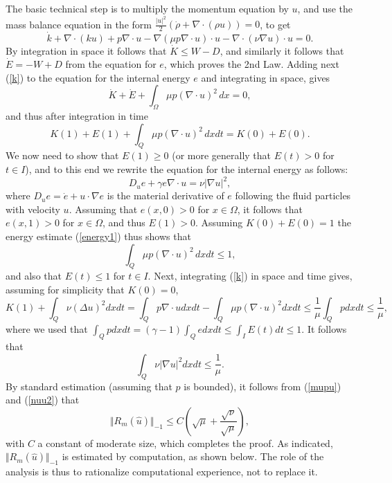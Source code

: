 The basic technical step is to multiply the momentum equation
by $u$, and use the mass balance equation in the form
$\frac{\vert u\vert^2}{2}(\dot \rho +\nabla\cdot (\rho u))=0$, to get
\begin{equation}\label{k}
\dot k +\nabla\cdot (ku)+p\nabla\cdot u -
\nabla (\mu p\nabla\cdot u)\cdot u-\nabla\cdot(\nu \nabla u)\cdot u=0.
\end{equation}
By integration in space it follows that $\dot K\le W-D$,
and similarly it follows that $\dot E =-W+D$ from the
equation for $e$, which proves the 2nd Law.
Adding next (\ref{k}) to the equation for the internal energy $e$ and
integrating in space, gives
\[
\dot K+\dot E +\int_\Omega \mu p(\nabla\cdot u)^2\, dx =0,
\]
and thus after integration in time
\begin{equation}\label{energy1}
K(1)+E(1) +\int_Q \mu p(\nabla\cdot u)^2\, dxdt =K(0)+E(0).
\end{equation}
We now need to show that $E(1)\ge 0$ (or more generally that $E(t)>0$
for $t\in I$), and to this end we
rewrite the equation for the internal energy as follows:
\[
D_ue +\gamma e\nabla\cdot u=  \nu \vert\nabla u\vert^2,
\]
where $D_ue=\dot e+u\cdot\nabla e$ is the material derivative
of $e$ following the fluid particles with velocity $u$.
 Assuming that $e(x,0)> 0$ for
$x\in\Omega $, it follows
that $e(x,1)>0$ for $x\in\Omega$, and thus $E(1)>0$.
Assuming $K(0)+E(0)=1$ the energy estimate
(\ref{energy1}) thus shows that
\begin{equation}\label{mupu}
\int_Q\mu p(\nabla\cdot u )^2\, dxdt \le 1,
\end{equation}
and also that $E(t)\le 1$ for $t\in I$.
Next, integrating (\ref{k}) in space and time gives, assuming
for simplicity that $K(0)=0$,
\[
K(1)+\int_Q\nu (\Delta u)^2dxdt=\int_Q p\nabla\cdot udxdt -
\int_Q\mu p(\nabla\cdot u)^2dxdt \le \frac{1}{\mu}\int_Qpdxdt\le \frac{1}{\mu},
\]
where we used that $\int_Q p dxdt=(\gamma -1)\int_Qedxdt \le \int_IE(t)dt\le 1$.
It follows that
\begin{equation}\label{nuu2}
\int_Q\nu \vert\nabla u\vert^2dxdt\le \frac{1}{\mu}.
\end{equation}
By standard estimation (assuming that $p$ is bounded),
it follows from (\ref{mupu}) and (\ref{nuu2}) that
\[
\Vert R_m(\hat u)\Vert_{-1}\le C( \sqrt{\mu}+\frac{\sqrt{\nu}}{\sqrt{\mu}}),
\]
with $C$ a constant of moderate size, which completes the proof. As indicated,
$\Vert R_m(\hat u)\Vert_{-1}$ is estimated by computation, as
shown below. The role of the analysis
is thus to rationalize computational experience, not to replace
it.


